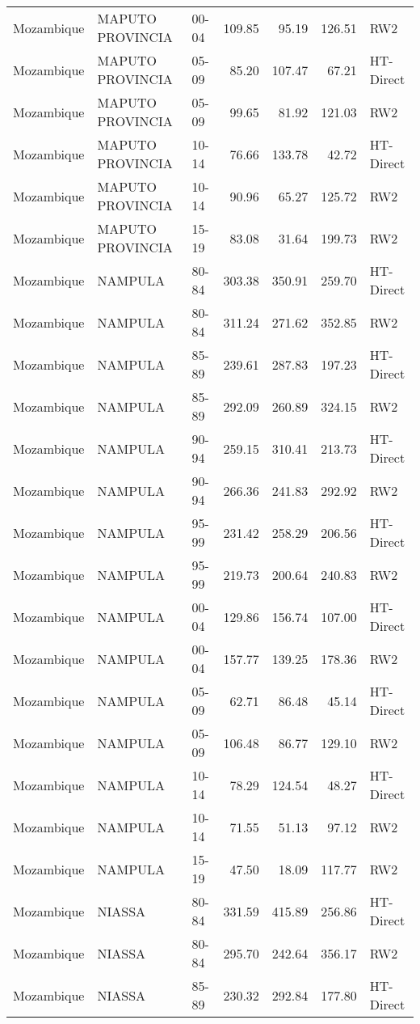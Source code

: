 \begin{longtable}{lllrrrl}
  Mozambique & MAPUTO PROVINCIA & 00-04 & 109.85 & 95.19 & 126.51 & RW2 \\ 
  Mozambique & MAPUTO PROVINCIA & 05-09 & 85.20 & 107.47 & 67.21 & HT-Direct \\ 
  Mozambique & MAPUTO PROVINCIA & 05-09 & 99.65 & 81.92 & 121.03 & RW2 \\ 
  Mozambique & MAPUTO PROVINCIA & 10-14 & 76.66 & 133.78 & 42.72 & HT-Direct \\ 
  Mozambique & MAPUTO PROVINCIA & 10-14 & 90.96 & 65.27 & 125.72 & RW2 \\ 
  Mozambique & MAPUTO PROVINCIA & 15-19 & 83.08 & 31.64 & 199.73 & RW2 \\ 
  Mozambique & NAMPULA & 80-84 & 303.38 & 350.91 & 259.70 & HT-Direct \\ 
  Mozambique & NAMPULA & 80-84 & 311.24 & 271.62 & 352.85 & RW2 \\ 
  Mozambique & NAMPULA & 85-89 & 239.61 & 287.83 & 197.23 & HT-Direct \\ 
  Mozambique & NAMPULA & 85-89 & 292.09 & 260.89 & 324.15 & RW2 \\ 
  Mozambique & NAMPULA & 90-94 & 259.15 & 310.41 & 213.73 & HT-Direct \\ 
  Mozambique & NAMPULA & 90-94 & 266.36 & 241.83 & 292.92 & RW2 \\ 
  Mozambique & NAMPULA & 95-99 & 231.42 & 258.29 & 206.56 & HT-Direct \\ 
  Mozambique & NAMPULA & 95-99 & 219.73 & 200.64 & 240.83 & RW2 \\ 
  Mozambique & NAMPULA & 00-04 & 129.86 & 156.74 & 107.00 & HT-Direct \\ 
  Mozambique & NAMPULA & 00-04 & 157.77 & 139.25 & 178.36 & RW2 \\ 
  Mozambique & NAMPULA & 05-09 & 62.71 & 86.48 & 45.14 & HT-Direct \\ 
  Mozambique & NAMPULA & 05-09 & 106.48 & 86.77 & 129.10 & RW2 \\ 
  Mozambique & NAMPULA & 10-14 & 78.29 & 124.54 & 48.27 & HT-Direct \\ 
  Mozambique & NAMPULA & 10-14 & 71.55 & 51.13 & 97.12 & RW2 \\ 
  Mozambique & NAMPULA & 15-19 & 47.50 & 18.09 & 117.77 & RW2 \\ 
  Mozambique & NIASSA & 80-84 & 331.59 & 415.89 & 256.86 & HT-Direct \\ 
  Mozambique & NIASSA & 80-84 & 295.70 & 242.64 & 356.17 & RW2 \\ 
  Mozambique & NIASSA & 85-89 & 230.32 & 292.84 & 177.80 & HT-Direct \\ 

\end{longtable}
